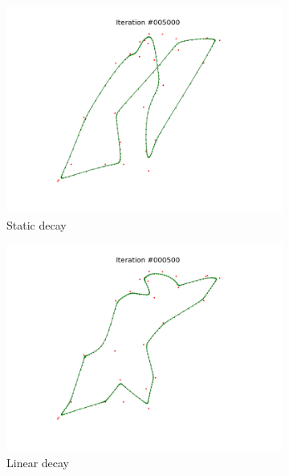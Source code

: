 \documentclass[11pt]{article}
\begin{document}
\begin{figure}
\centering
\begin{subfigure}{.33\textwidth}
  \centering
  \includegraphics[trim={4cm 2cm 4cm 2cm}, clip=true,
  width=\linewidth]{w_s.png}
  \caption{Static decay}
  \label{fig:ws}
\end{subfigure}%
\begin{subfigure}{.33\textwidth}
  \centering
  \includegraphics[trim={4cm 2cm 4cm 2cm}, clip=true,width=\linewidth]{w_l.png}
  \caption{Linear decay}
  \label{fig:wl}
\end{subfigure}
\begin{subfigure}{.33\textwidth}
  \centering

\end{subfigure}
\end{figure}
\end{document}
